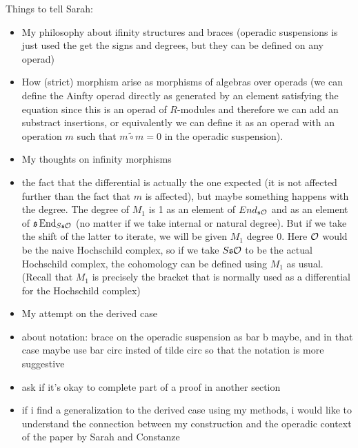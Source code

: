 \documentclass[twoside]{article}
\begin{document}
Things to tell Sarah:
\begin{itemize}
\item My philosophy about ifinity structures and braces (operadic suspensions is just used the get the signs and degrees, but they can be defined on any operad)
\item How (strict) morphism arise as morphisms of algebras over operads (we can define the Ainfty operad directly as generated by an element satisfying the equation since this is an operad of $R$-modules and therefore we can add an substract insertions, or equivalently we can define it as an operad with an operation $m$ such that $m\tilde{\circ}m=0$ in the operadic suspension).
\item My thoughts on infinity morphisms
\item the fact that the differential is actually the one expected (it is not affected further than the fact that $m$ is affected), but maybe something happens with the degree. The degree of $M_1$ is 1 as an element of $End_{\mathfrak{s}{\mathcal O}}$ and as an element of $\mathfrak{s}\operatorname{End}_{S\mathfrak{s}{\mathcal O}}$ (no matter if we take internal or natural degree). But if we take the shift of the latter to iterate, we will be given $M_1$ degree 0. Here ${\mathcal O}$ would be the naive Hochschild complex, so if we take $S\mathfrak{s}{\mathcal O}$ to be the actual Hochschild complex, the cohomology can be defined using $M_1$ as usual. (Recall that $M_1$ is precisely the bracket that is normally used as a differential for the Hochschild complex)
\item My attempt on the derived case
\item about notation: brace on the operadic suspension as bar b maybe, and in that case maybe use bar circ insted of tilde circ so that the notation is more suggestive
\item ask if it's okay to complete part of a proof in another section
\item if i find a generalization to the derived case using my methods, i would like to understand the connection between my construction and the operadic context of the paper by Sarah and Constanze
\end{itemize}
\end{document}
